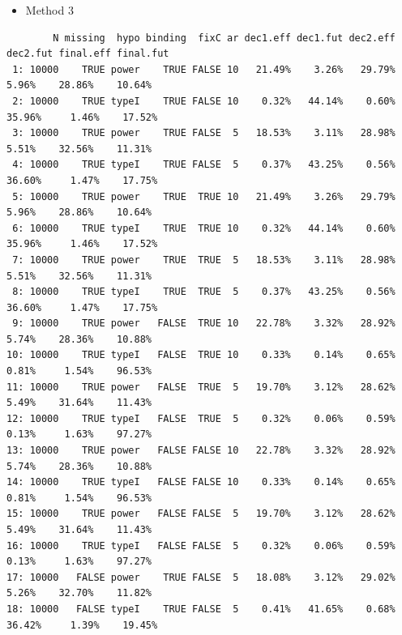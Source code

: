 \documentclass[12pt]{article}
\begin{document}
\begin{itemize}
\item Method 3
\end{itemize}
\begin{verbatim}
        N missing  hypo binding  fixC ar dec1.eff dec1.fut dec2.eff dec2.fut final.eff final.fut
 1: 10000    TRUE power    TRUE FALSE 10   21.49%    3.26%   29.79%    5.96%    28.86%    10.64%
 2: 10000    TRUE typeI    TRUE FALSE 10    0.32%   44.14%    0.60%   35.96%     1.46%    17.52%
 3: 10000    TRUE power    TRUE FALSE  5   18.53%    3.11%   28.98%    5.51%    32.56%    11.31%
 4: 10000    TRUE typeI    TRUE FALSE  5    0.37%   43.25%    0.56%   36.60%     1.47%    17.75%
 5: 10000    TRUE power    TRUE  TRUE 10   21.49%    3.26%   29.79%    5.96%    28.86%    10.64%
 6: 10000    TRUE typeI    TRUE  TRUE 10    0.32%   44.14%    0.60%   35.96%     1.46%    17.52%
 7: 10000    TRUE power    TRUE  TRUE  5   18.53%    3.11%   28.98%    5.51%    32.56%    11.31%
 8: 10000    TRUE typeI    TRUE  TRUE  5    0.37%   43.25%    0.56%   36.60%     1.47%    17.75%
 9: 10000    TRUE power   FALSE  TRUE 10   22.78%    3.32%   28.92%    5.74%    28.36%    10.88%
10: 10000    TRUE typeI   FALSE  TRUE 10    0.33%    0.14%    0.65%    0.81%     1.54%    96.53%
11: 10000    TRUE power   FALSE  TRUE  5   19.70%    3.12%   28.62%    5.49%    31.64%    11.43%
12: 10000    TRUE typeI   FALSE  TRUE  5    0.32%    0.06%    0.59%    0.13%     1.63%    97.27%
13: 10000    TRUE power   FALSE FALSE 10   22.78%    3.32%   28.92%    5.74%    28.36%    10.88%
14: 10000    TRUE typeI   FALSE FALSE 10    0.33%    0.14%    0.65%    0.81%     1.54%    96.53%
15: 10000    TRUE power   FALSE FALSE  5   19.70%    3.12%   28.62%    5.49%    31.64%    11.43%
16: 10000    TRUE typeI   FALSE FALSE  5    0.32%    0.06%    0.59%    0.13%     1.63%    97.27%
17: 10000   FALSE power    TRUE FALSE  5   18.08%    3.12%   29.02%    5.26%    32.70%    11.82%
18: 10000   FALSE typeI    TRUE FALSE  5    0.41%   41.65%    0.68%   36.42%     1.39%    19.45%
\end{verbatim}
\end{document}
